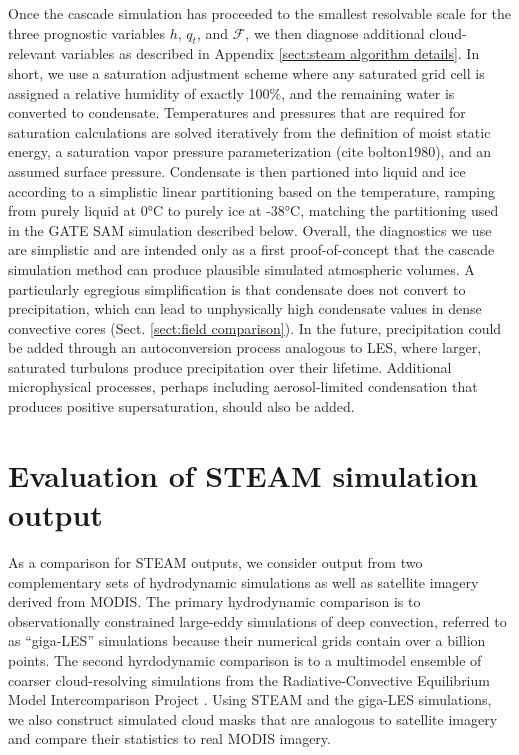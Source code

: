 \documentclass[acp, manuscript, english]{copernicus}
\begin{document}
Once the cascade simulation has proceeded to the smallest resolvable scale for the three prognostic variables $h$, $q_t$, and $\mathcal{F}$, we then diagnose additional cloud-relevant variables as described in Appendix \ref{sect:steam algorithm details}. In short, we use a saturation adjustment scheme where any saturated grid cell is assigned a relative humidity of exactly 100\%, and the remaining water is converted to condensate. Temperatures and pressures that are required for saturation calculations are solved iteratively from the definition of moist static energy, a saturation vapor pressure parameterization (cite bolton1980), and an assumed surface pressure. Condensate is then partioned into liquid and ice according to a simplistic linear partitioning based on the temperature, ramping from purely liquid at 0°C to purely ice at -38°C, matching the partitioning used in the GATE SAM simulation described below. Overall, the diagnostics we use are simplistic and are intended only as a first proof-of-concept that the cascade simulation method can produce plausible simulated atmospheric volumes. A particularly egregious simplification is that condensate does not convert to precipitation, which can lead to unphysically high condensate values in dense convective cores (Sect. \ref{sect:field comparison}). In the future, precipitation could be added through an autoconversion process analogous to LES, where larger, saturated turbulons produce precipitation over their lifetime. Additional microphysical processes, perhaps including aerosol-limited condensation that produces positive supersaturation, should also be added.



\section{Evaluation of STEAM simulation output} \label{sect:evaluation}

As a comparison for STEAM outputs, we consider output from two complementary sets of hydrodynamic simulations as well as satellite imagery derived from MODIS. The primary hydrodynamic comparison is to observationally constrained large-eddy simulations of deep convection, referred to as ``giga-LES'' simulations because their numerical grids contain over a billion points. The second hyrdodynamic comparison is to a multimodel ensemble of coarser cloud-resolving simulations from the Radiative-Convective Equilibrium Model Intercomparison Project \citep[RCEMIP;][]{wing2018, wing2020}. Using STEAM and the giga-LES simulations, we also construct simulated cloud masks that are analogous to satellite imagery and compare their statistics to real MODIS imagery.
\end{document}
